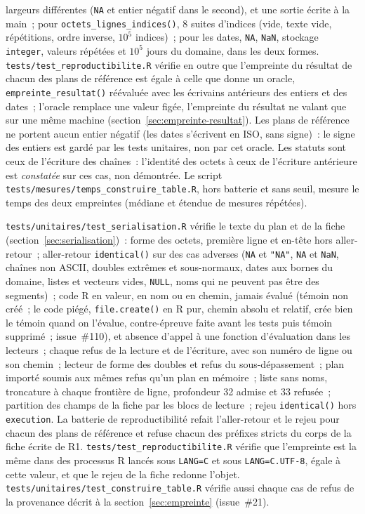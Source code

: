 \documentclass[a4paper,11pt]{article}
\newcommand{\code}[1]{\texttt{\small #1}}
\begin{document}
{largeurs différentes (\code{NA} et entier négatif dans le second), et une
sortie écrite à la
main~; pour \code{octets\_lignes\_indices()}, 8 suites d'indices (vide,
texte vide, répétitions, ordre inverse, $10^5$ indices)~; pour les dates,
\code{NA}, \code{NaN}, stockage \code{integer}, valeurs répétées et $10^5$
jours du domaine, dans les deux formes. \code{tests/test\_reproductibilite.R}
vérifie en outre que l'empreinte du résultat de chacun des plans de
référence est égale à celle que donne un oracle, \code{empreinte\_resultat()}
réévaluée avec les écrivains antérieurs des entiers et des dates~; l'oracle
remplace une valeur figée, l'empreinte du résultat ne valant que sur une
même machine (section~\ref{sec:empreinte-resultat}). Les plans de référence
ne portent aucun entier négatif (les dates s'écrivent en ISO, sans
signe)~: le signe des entiers est gardé par les
tests unitaires, non par cet oracle. Les statuts sont ceux de l'écriture
des chaînes~: l'identité des octets à ceux de l'écriture antérieure est
\emph{constatée} sur ces cas, non démontrée. Le script
\code{tests/mesures/temps\_construire\_table.R}, hors batterie et sans
seuil, mesure le temps des deux empreintes (médiane et étendue de mesures
répétées).\par}

\medskip
\code{tests/unitaires/test\_serialisation.R} vérifie le texte du plan et de
la fiche (section~\ref{sec:serialisation})~: forme des octets, première
ligne et en-tête hors aller-retour~; aller-retour \code{identical()} sur des
cas adverses (\code{NA} et \code{"NA"}, \code{NA} et \code{NaN}, chaînes non
ASCII, doubles extrêmes et sous-normaux, dates aux bornes du domaine, listes
et vecteurs vides, \code{NULL}, noms qui ne peuvent pas être des segments)~;
code R en valeur, en nom ou en chemin, jamais évalué (témoin non créé~;
le code piégé, \code{file.create()} en R pur, chemin absolu et relatif,
crée bien le témoin quand on l'évalue, contre-épreuve faite avant les tests
puis témoin supprimé~; issue~\#110), et
absence d'appel à une fonction d'évaluation dans les lecteurs~; chaque refus
de la lecture et de l'écriture, avec son numéro de ligne ou son chemin~;
lecteur de forme des doubles et refus du sous-dépassement~; plan importé
soumis aux mêmes refus qu'un plan en mémoire~; liste sans noms, troncature
à chaque frontière de ligne, profondeur 32 admise et 33 refusée~; partition
des champs de la fiche par les blocs de lecture~; rejeu
\code{identical()} hors \code{execution}. La batterie de reproductibilité
refait l'aller-retour et le rejeu pour chacun des plans de référence et refuse
chacun des préfixes stricts du corps de la fiche écrite de R1. \code{tests/test\_reproductibilite.R} vérifie que l'empreinte est
la même dans des processus R lancés sous \code{LANG=C} et sous
\code{LANG=C.UTF-8}, égale à cette valeur, et que le rejeu de la fiche redonne
l'objet. \code{tests/unitaires/test\_construire\_table.R} vérifie aussi
chaque cas de refus de la provenance décrit à la
section~\ref{sec:empreinte} (issue~\#21).
\end{document}
